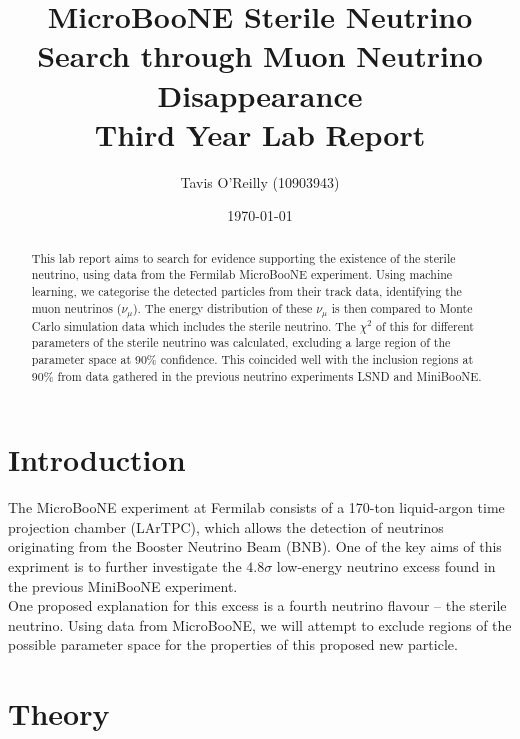 \documentclass[reprint,
    nofootinbib,
    amsmath,amssymb,
    aps,
    10pt,
    nolongbibliography,
]{revtex4-2}
\begin{document}
\title{\Large MicroBooNE Sterile Neutrino Search through Muon Neutrino Disappearance \\[0.2cm]
 \normalsize Third Year Lab Report}

\author{Tavis O'Reilly (10903943)}

\date{\today}

\begin{abstract}
\normalsize
\noindent
This lab report aims to search for evidence supporting the existence of the sterile neutrino, using
data from the Fermilab MicroBooNE experiment. Using machine learning, we categorise the detected
particles from their track data, identifying the muon neutrinos ($\nu_\mu$). The
energy distribution of these $\nu_\mu$ is then compared to Monte Carlo simulation data which includes the
sterile neutrino. The $\chi^2$ of this for different parameters of the sterile neutrino was calculated, 
excluding a large region of the parameter space at 90\% confidence. This coincided well with the
inclusion regions at 90\% from data gathered in the previous neutrino experiments LSND and MiniBooNE.

\end{abstract}

\maketitle

\section{Introduction}

The MicroBooNE experiment at Fermilab consists of a 170-ton liquid-argon time projection chamber 
(LArTPC)\cite{microboone},
which allows the detection of neutrinos originating from the Booster Neutrino Beam (BNB). One of the key
aims of this expriment is to further investigate the $4.8\sigma$ low-energy neutrino excess found in the
previous MiniBooNE experiment\cite{miniboone_excess}. \\

One proposed explanation for this excess is a fourth neutrino flavour -- the sterile neutrino. Using 
data from MicroBooNE, we will attempt to exclude regions of the possible parameter space for the
properties of this proposed new particle.

\section{Theory}
\end{document}
